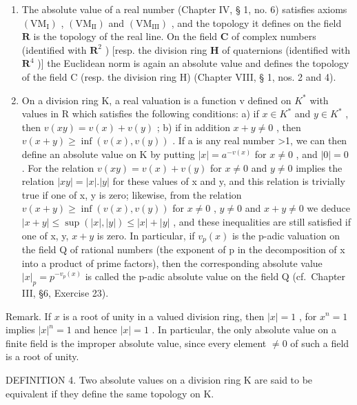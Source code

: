 \begin{enumerate}
\def\labelenumi{\arabic{enumi})}
\setcounter{enumi}{1}
\item
  The absolute value of a real number (Chapter IV, § 1, no. 6) satisfies axioms \((\mathrm{VM}_{\mathrm{I}})\) , \((\mathrm{VM}_{\mathrm{II}})\) and \((\mathrm{VM}_{\mathrm{III}})\) , and the topology it defines on the field \(\mathbf{R}\) is the topology of the real line. On the field \(\mathbf{C}\) of complex numbers (identified with \(\mathbf{R}^2\) ) {[}resp. the division ring \(\mathbf{H}\) of quaternions (identified with \(\mathbf{R}^4\) ){]} the Euclidean norm is again an absolute value and defines the topology of the field C (resp. the division ring H) (Chapter VIII, § 1, nos. 2 and 4).
\item
  On a division ring K, a real valuation is a function v defined on \(K^{*}\) with values in R which satisfies the following conditions: a) if \(x \in K^{*}\) and \(y \in K^{*}\) , then \(v(xy) = v(x) + v(y)\) ; b) if in addition \(x + y \neq 0\) , then \(v(x + y) \geqslant \inf(v(x), v(y))\) . If a is any real number \textgreater1, we can then define an absolute value on K by putting \(|x| = a^{-v(x)}\) for \(x \neq 0\) , and \(|0| = 0\) . For the relation \(v(xy) = v(x) + v(y)\) for \(x \neq 0\) and \(y \neq 0\) implies the relation \(|xy| = |x|.|y|\) for these values of x and y, and this relation is trivially true if one of x, y is zero; likewise, from the relation \(v(x + y) \geqslant \inf(v(x), v(y))\) for \(x \neq 0\) , \(y \neq 0\) and \(x + y \neq 0\) we deduce \(|x + y| \leqslant \sup(|x|, |y|) \leqslant |x| + |y|\) , and these inequalities are still satisfied if one of x, y, \(x + y\) is zero. In particular, if \(v_{p}(x)\) is the p-adic valuation on the field Q of rational numbers (the exponent of p in the decomposition of x into a product of prime factors), then the corresponding absolute value \(|x|_{p} = p^{-v_{p}(x)}\) is called the p-adic absolute value on the field Q (cf.~Chapter III, §6, Exercise 23).
\end{enumerate}

Remark. If \(x\) is a root of unity in a valued division ring, then \(|x| = 1\) , for \(x^n = 1\) implies \(|x|^n = 1\) and hence \(|x| = 1\) . In particular, the only absolute value on a finite field is the improper absolute value, since every element \(\neq 0\) of such a field is a root of unity.

DEFINITION 4. Two absolute values on a division ring K are said to be equivalent if they define the same topology on K.

